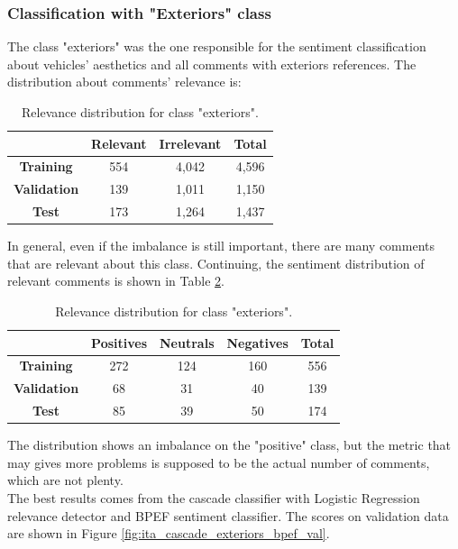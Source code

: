 \subsubsection{Classification with "Exteriors" class}

The class "exteriors" was the one responsible for the sentiment classification about vehicles' aesthetics and all comments with exteriors references. The distribution about comments' relevance is:

\begin{table}[H]
	\centering
	\begin{tabular}{ | c  c  c | c | } 
		\hline
		& \textbf{Relevant} & \textbf{Irrelevant} & \textbf{Total} \\
		\hline
		\textbf{Training} & 554 & 4,042 & 4,596 \\ 
		\hline
		\textbf{Validation} & 139 & 1,011 & 1,150 \\ 
		\hline
		\textbf{Test} & 173 & 1,264 & 1,437 \\
		\hline
	\end{tabular}
	\caption{Relevance distribution for class "exteriors".}
	\label{table:rel-dist-exteriors}
\end{table}

In general, even if the imbalance is still important, there are many comments that are relevant about this class. Continuing, the sentiment distribution of relevant comments is shown in Table \ref{table:snt-dist-exteriors}.

\begin{table}[H]
	\centering
	\begin{tabular}{ | c  c  c c | c | } 
		\hline
		& \textbf{Positives} & \textbf{Neutrals} & \textbf{Negatives} & \textbf{Total} \\
		\hline
		\textbf{Training} & 272 & 124 & 160 & 556 \\ 
		\hline
		\textbf{Validation} & 68 & 31 & 40 & 139 \\ 
		\hline
		\textbf{Test} & 85 & 39 & 50 & 174 \\
		\hline
	\end{tabular}
	\caption{Relevance distribution for class "exteriors".}
	\label{table:snt-dist-exteriors}
\end{table}

The distribution shows an imbalance on the "positive" class, but the metric that may gives more problems is supposed to be the actual number of comments, which are not plenty.\\
The best results comes from the cascade classifier with Logistic Regression relevance detector and BPEF sentiment classifier. The scores on validation data are shown in Figure \ref{fig:ita_cascade_exteriors_bpef_val}.

